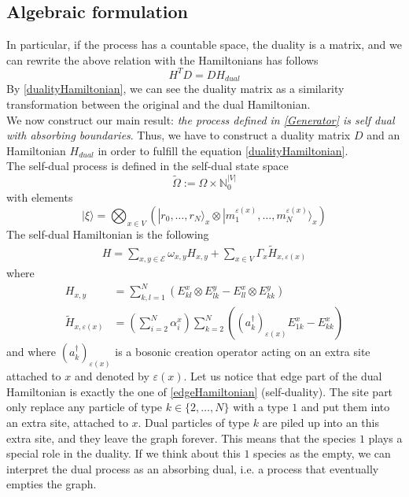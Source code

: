 \documentclass[11pt]{article}
\numberwithin{equation}{subsection}
\begin{document}
\subsection{Algebraic formulation}
In particular, if the process has a countable space, the duality is a matrix, and we can rewrite the above relation with the Hamiltonians has follows
\begin{equation}\label{dualityHamiltonian}
    H^{T}D=DH_{dual}
\end{equation}
By \eqref{dualityHamiltonian}, we can see the duality matrix as a similarity transformation between the original and the dual Hamiltonian. \\
We now construct our main result: \textit{the process defined in \eqref{Generator} is self dual with absorbing boundaries}. Thus, we have to construct a duality matrix $D$ and an Hamiltonian $H_{dual}$ in order to fulfill the equation \eqref{dualityHamiltonian}.
\\
The self-dual process is defined in the self-dual state space 
\begin{equation}\widetilde{\Omega}:=\Omega\times \mathbb{N}_{0}^{|V|}\end{equation} with elements
\begin{equation}
	|\xi\rangle=\bigotimes_{x\in V}\left(|r_{0},\ldots,r_{N}\rangle_{x}\otimes |m_{1}^{\varepsilon(x)},\ldots,m_{N}^{\varepsilon(x)}\rangle_{x}\right)
\end{equation}
The self-dual Hamiltonian is the following
\begin{equation}
	\begin{split}
		H=\sum_{x,y\in \mathcal{E}}\omega_{x,y}H_{x,y}+\sum_{x\in V}\Gamma_{x}\widetilde{H}_{x,\varepsilon(x)}
	\end{split}
\end{equation}
where
\begin{align}
H_{x,y}&=\sum_{k,l=1}^{N}\left(E_{kl}^{x}\otimes E_{lk}^{y}-E_{ll}^{x}\otimes E_{kk}^{y}\right)\\
\widetilde{H}_{x,\varepsilon(x)}&=\left(\sum_{i=2}^{N}\alpha_{i}^{x}\right)\sum_{k=2}^{N}\left((a^{\dagger}_{k})_{\varepsilon(x)}E_{1k}^{x}-E_{kk}^{x}\right)
\end{align}
and where  $(a^{\dagger}_{k})_{\varepsilon(x)}$ is a bosonic creation operator acting on an extra site attached to $x$ and denoted by $\varepsilon(x)$. Let us notice that edge part of the dual Hamiltonian is exactly the one of \eqref{edgeHamiltonian} (self-duality). The site part only replace any particle of type $k\in \{2,\ldots,N\}$ with a type $1$  and put them into an extra site, attached to $x$. Dual particles of type $k$ are piled up into an this extra site, and they leave the graph forever. This means that the species $1$ plays a special role in the duality. If we think about this $1$ species as the empty, we can interpret the dual process as an absorbing dual, i.e. a process that eventually empties the graph.\\
\end{document}
